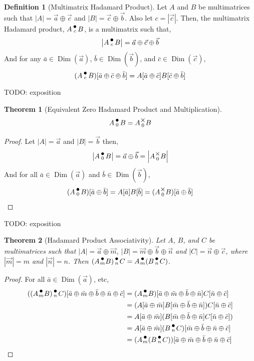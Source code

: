 \documentclass[12pt]{book}
\theoremstyle{plain}
\newtheorem{theorem}{Theorem}[chapter]
\theoremstyle{definition}
\newtheorem{definition}{Definition}[chapter]
\theoremstyle{ppart}
\theoremstyle{case}
\theoremstyle{solution}
\DeclareMathOperator{\Dim}{Dim}
\newcommand{\mmult}[1]{\text{\raisebox{1ex}{$\underset{#1}{\times}$}}}
\newcommand{\dmult}[1]{\text{\raisebox{1ex}{$\underset{#1}{\,\bullet\,}$}}}
\newcommand{\shape}[1]{\left|#1\right|}
\begin{document}
\begin{definition}[Multimatrix Hadamard Product]
\label{multi_had_prod}
Let $A$ and $B$ be multimatrices such that $\shape{A} = \vec{a} \oplus \vec{c}$
and $\shape{B} = \vec{c} \oplus \vec{b}$. Also let $c = \shape{\vec{c}}$.
Then, the multimatrix Hadamard product, $A \dmult{c} B$, is a multimatrix
such that,
\[ \shape{A \dmult{c} B} = \vec{a} \oplus \vec{c} \oplus \vec{b} \]
And for any $\bar{a} \in \Dim(\vec{a})$, $\bar{b} \in \Dim(\vec{b})$,
and $\bar{c} \in \Dim(\vec{c})$,
\[
  (A \dmult{c} B)[\bar{a} \oplus \bar{c} \oplus \bar{b}]
  = A[\bar{a} \oplus \bar{c}] B[\bar{c} \oplus \bar{b}]
\]
\end{definition}

TODO: exposition

\begin{theorem}[Equivalent Zero Hadamard Product and Multiplication]
\[ A \dmult{0} B = A \mmult{0} B \]
\end{theorem}
\begin{proof}
Let $\shape{A} = \vec{a}$ and $\shape{B} = \vec{b}$ then,
\[ \shape{A \dmult{0} B} = \vec{a} \oplus \vec{b} = \shape{A \mmult{0} B} \]
And for all $\bar{a} \in \Dim(\vec{a})$ and $\bar{b} \in \Dim(\vec{b})$,
\[ (A \dmult{0} B)[\bar{a} \oplus \bar{b}] = A[\bar{a}] B[\bar{b}] = (A \mmult{0} B)[\bar{a} \oplus \bar{b}] \]
\end{proof}

TODO: exposition

\begin{theorem}[Hadamard Product Associativity]
Let $A$, $B$, and $C$ be multimatrices such that $\shape{A} = \vec{a} \oplus \vec{m}$,
$\shape{B} = \vec{m} \oplus \vec{b} \oplus \vec{n}$ and $\shape{C} = \vec{n} \oplus \vec{c}$,
where $\shape{\vec{m}} = m$ and $\shape{\vec{n}} = n$.
Then $(A \dmult{m} B) \dmult{n} C = A \dmult{m} (B \dmult{n} C)$.
\end{theorem}
\begin{proof}
For all $\bar{a} \in \Dim(\vec{a})$, etc,
\begin{align*}
((A \dmult{m} B) \dmult{n} C)[\bar{a} \oplus \bar{m} \oplus \bar{b} \oplus \bar{n} \oplus \bar{c}]
  &= (A \dmult{m} B)[\bar{a} \oplus \bar{m} \oplus \bar{b} \oplus \bar{n}] C[\bar{n} \oplus \bar{c}] \\
  &= (A[\bar{a} \oplus \bar{m}] B[\bar{m} \oplus \bar{b} \oplus \bar{n}]) C[\bar{n} \oplus \bar{c}] \\
  &= A[\bar{a} \oplus \bar{m}] (B[\bar{m} \oplus \bar{b} \oplus \bar{n}] C[\bar{n} \oplus \bar{c}]) \\
  &= A[\bar{a} \oplus \bar{m}] (B \dmult{n} C)[\bar{m} \oplus \bar{b} \oplus \bar{n} \oplus \bar{c}] \\
  &= (A \dmult{m} (B \dmult{n} C))[\bar{a} \oplus \bar{m} \oplus \bar{b} \oplus \bar{n} \oplus \bar{c}]
\end{align*}
\end{proof}
\end{document}
